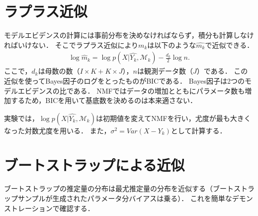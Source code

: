 \section{ラプラス近似}
モデルエビデンスの計算には事前分布を決めなければならず，積分も計算しなければいけない．
そこでラプラス近似により$m_k$は以下のような$\hat{m_k}$で近似できる．
\begin{align}
	\log \hat{m}_k = \log p(X | \hat{Y_k}, \mathcal{M}_k) - \frac{d_k}{2} \log n.
	\label{eq:simm}
\end{align}
ここで，$d_k$は母数の数（$I \times K + K \times J$），$n$は観測データ数（$J$）である．
この近似を使ってBayes因子のログをとったものがBICである．
Bayes因子は2つのモデルエビデンスの比である．
NMFではデータの増加とともにパラメータ数も増加するため，BICを用いて基底数を決めるのは本来適さない．

実験では，$\log p(X | \hat{Y_k}, \mathcal{M}_k)$は初期値を変えてNMFを行い，尤度が最も大きくなった対数尤度を用いる．
また，$\sigma^2 = Var(X - Y_k)$として計算する．

\section{ブートストラップによる近似}
ブートストラップの推定量の分布は最尤推定量の分布を近似する（ブートストラップサンプルが生成されたパラメータ分バイアスは乗る）．
これを簡単なデモンストレーションで確認する．

